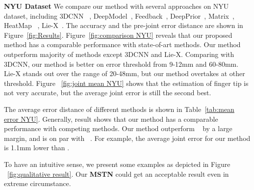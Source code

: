 \documentclass[journal,comsoc]{IEEEtran}
\begin{document}
\textbf{NYU Dataset}
We compare our method with several approaches on NYU dataset, including 3DCNN
~\cite{ge2017_3D}, DeepModel~\cite{zhou2016model}, Feedback~\cite{oberweger2015training},
DeepPrior~\cite{oberweger2015hands}, Matrix~\cite{sinha2016deephand}, HeatMap
~\cite{tompson2014real}, Lie-X~\cite{xu2017lie}. The accuracy and the pre-joint
error distance are shown in Figure~\ref{fig:Results}. Figure~\ref{fig:comparison NYU}
reveals that our proposed method has a comparable performance with state-of-art methods.
Our method outperform majority of methods except 3DCNN and Lie-X. Comparing with 3DCNN,
our method is better on error threshold from 9-12mm and 60-80mm. Lie-X stands out over
the range of 20-48mm, but our method overtakes at other threshold. Figure
~\ref{fig:joint mean NYU} shows that the estimation of finger tip is not very accurate,
but the average joint error is still the second best.

The average error distance of different methods is shown in Table~\ref{tab:mean error NYU}.
Generally, result shows that our method has a comparable performance with competing methods.
Our method outperform ~\cite{tompson2014real,oberweger2015hands,oberweger2015training,zhou2016model}
by a large margin, and is on par with ~\cite{xu2017lie}. For example, the average joint
error for our method is 1.1mm lower than \cite{oberweger2015training}.

To have an intuitive sense, we present some examples as depicted in Figure
~\ref{fig:qualitative result}. Our \textbf{MSTN} could get an acceptable result
even in extreme circumstance.
\end{document}
